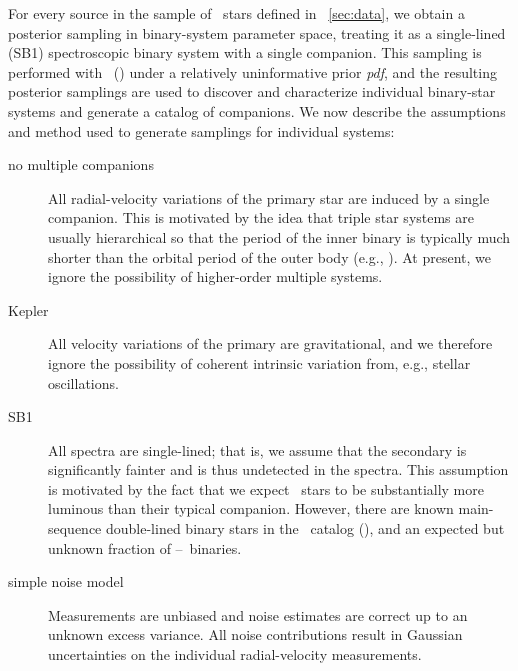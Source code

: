 \documentclass[modern, letterpaper]{aastex62}
\newcommand{\apogee}{\project{\acronym{APOGEE}}}
\newcommand{\thejoker}{\project{The~Joker}}
\newcommand{\RGB}{\acronym{RGB}}
\newcommand{\pdf}{\textit{pdf}}
\begin{document}
For every source in the sample of \apogee\ stars defined in
\sectionname~\ref{sec:data}, we obtain a posterior sampling in binary-system
parameter space, treating it as a single-lined (SB1) spectroscopic binary system
with a single companion.
This sampling is performed with \thejoker\ (\citealt{Price-Whelan:2017}) under a
relatively uninformative prior \pdf, and the resulting posterior samplings are
used to discover and characterize individual binary-star systems and generate a
catalog of companions.
We now describe the assumptions and method used to generate samplings for
individual systems:
\begin{description}
\item[no multiple companions] All radial-velocity variations of the primary
  star are induced by a single companion.
  This is motivated by the idea that triple star systems are usually
  hierarchical so that the period of the inner binary is typically much shorter
  than the orbital period of the outer body (e.g., \citealt{Tokovinin:2018}).
  At present, we ignore the possibility of higher-order multiple systems.
\item[Kepler] All velocity variations of the primary
  are gravitational, and we therefore ignore the possibility of coherent
  intrinsic variation from, e.g., stellar oscillations.
\item[SB1] All spectra are single-lined; that is, we assume that the secondary
  is significantly fainter and is thus undetected in the spectra.
  This assumption is motivated by the fact that we expect \RGB\ stars to be
  substantially more luminous than their typical companion.
  However, there are known main-sequence double-lined binary stars in the
  \apogee\ catalog (\citealt{El-Badry:2018}), and an expected but unknown
  fraction of \RGB--\RGB\ binaries.
\item[simple noise model] Measurements are unbiased and noise estimates are
  correct up to an unknown excess variance.
  All noise contributions result in Gaussian uncertainties on the individual
  radial-velocity measurements.
\end{description}
\end{document}
